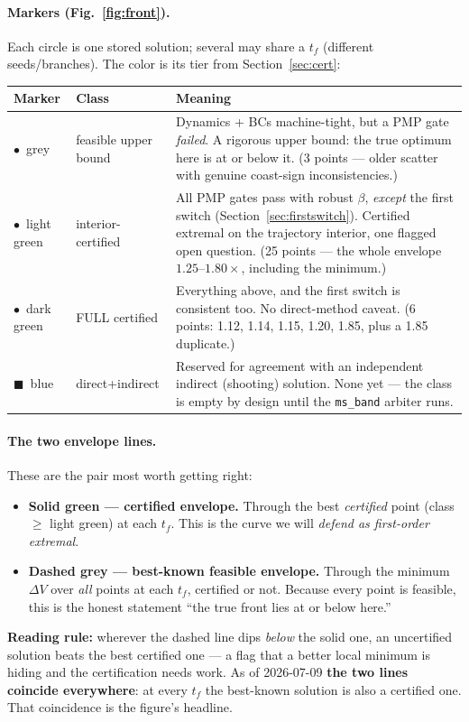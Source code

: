 \documentclass[11pt]{article}
\newcommand{\dV}{\Delta V}
\newcommand{\tf}{t_f}
\begin{document}
\paragraph{Markers (Fig.~\ref{fig:front}).} Each circle is one stored solution;
several may share a $\tf$ (different seeds/branches). The color is its tier from
Section~\ref{sec:cert}:
\begin{center}
\renewcommand{\arraystretch}{1.3}
\begin{tabular}{>{\raggedright}p{3.1cm} p{2.4cm} p{8.2cm}}
\toprule
\textbf{Marker} & \textbf{Class} & \textbf{Meaning} \\
\midrule
{\color{tierGrey}$\bullet$}~grey &
feasible upper bound &
Dynamics + BCs machine-tight, but a PMP gate \emph{failed}. A rigorous upper
bound: the true optimum here is at or below it. (3 points --- older scatter with
genuine coast-sign inconsistencies.) \\
{\color{tierLight}$\bullet$}~light green &
interior-certified &
All PMP gates pass with robust $\beta$, \emph{except} the first switch
(Section~\ref{sec:firstswitch}). Certified extremal on the trajectory interior,
one flagged open question. (25 points --- the whole envelope $1.25$--$1.80\times$,
including the minimum.) \\
{\color{tierDark}$\bullet$}~dark green &
FULL certified &
Everything above, and the first switch is consistent too. No direct-method
caveat. (6 points: 1.12, 1.14, 1.15, 1.20, 1.85, plus a 1.85 duplicate.) \\
$\blacksquare$~blue &
direct+indirect &
Reserved for agreement with an independent indirect (shooting) solution. None
yet --- the class is empty by design until the \texttt{ms\_band} arbiter runs. \\
\bottomrule
\end{tabular}
\end{center}

\paragraph{The two envelope lines.} These are the pair most worth getting right:
\begin{itemize}
\item \textbf{Solid green --- certified envelope.} Through the best
\emph{certified} point (class $\ge$ light green) at each $\tf$. This is the curve
we will \emph{defend as first-order extremal}.
\item \textbf{Dashed grey --- best-known feasible envelope.} Through the minimum
$\dV$ over \emph{all} points at each $\tf$, certified or not. Because every point
is feasible, this is the honest statement ``the true front lies at or below
here.''
\end{itemize}
\textbf{Reading rule:} wherever the dashed line dips \emph{below} the solid one,
an uncertified solution beats the best certified one --- a flag that a better
local minimum is hiding and the certification needs work. As of 2026-07-09
\textbf{the two lines coincide everywhere}: at every $\tf$ the best-known
solution is also a certified one. That coincidence is the figure's headline.
\end{document}
